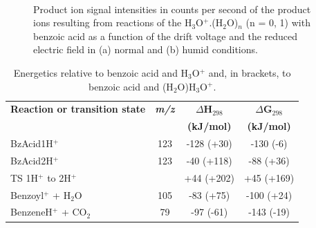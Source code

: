 \begin{figure}[htbp]
\centering
{}\\
\caption{Product ion signal intensities in counts per second of the product ions resulting from reactions of the H$_3$O$^+$.(H$_2$O)$_n$ (n = 0, 1) with benzoic acid as a function of the drift voltage and the reduced electric field in (a) normal and (b) humid conditions.} 
\label{fig:bzacidEN}
\end{figure}

\begin{table}[htbp]
\centering
\caption{Energetics relative to benzoic acid and H$_3$O$^+$ and, in brackets, to benzoic acid and (H$_2$O)H$_3$O$^+$.}
\label{tb:bzacid2}
\begin{tabular}{lccc}
\toprule
\textbf{Reaction or transition state}	&\textbf{\textit{m/z} } &\textbf{$\Delta$H$_{298}$} &\textbf{$\Delta$G$_{298}$}\\
& &	\textbf{(kJ/mol)} &\textbf{(kJ/mol)} \\  \toprule
BzAcid1H$^+$ & 123 & -128 (+30) & -130 (-6) \\ \midrule
BzAcid2H$^+$ & 123 & -40 (+118) & -88 (+36) \\ \midrule
TS 1H$^+$ to 2H$^+$ &  & +44 (+202) & +45 (+169) \\ \midrule
Benzoyl$^+$ + H$_2$O  & 105 & -83 (+75) & -100 (+24) \\ \midrule
BenzeneH$^+$ + CO$_2$ & 79 & -97 (-61) & -143 (-19) \\
\bottomrule
\end{tabular}
\end{table}

